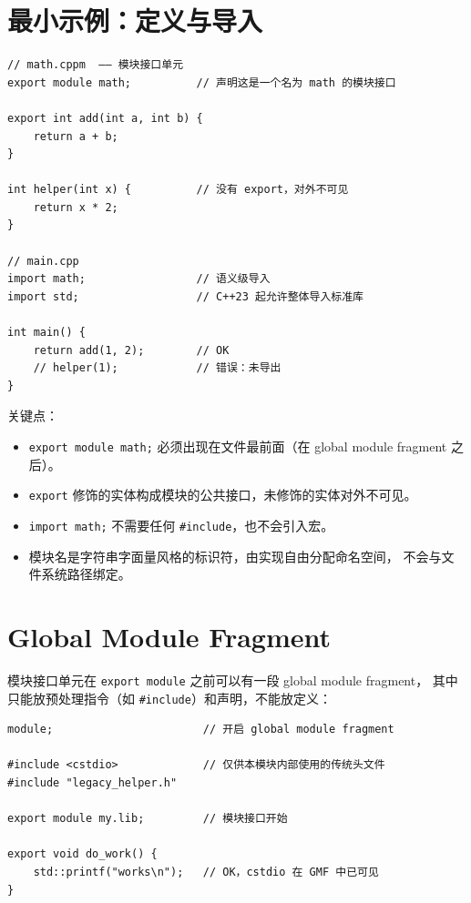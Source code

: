 \documentclass[12pt,a4paper,fontset=fandol]{ctexbook}
\newcommand{\cpplabel}{%
  \tcbox[on line,colback=cppheadbg,colframe=cppheadbg,
    boxrule=0pt,arc=1pt,left=2pt,right=2pt,top=1pt,bottom=1pt,
    colupper=white,fontupper=\scriptsize\bfseries]{C++}}
\newcommand{\flag}[1]{\texttt{#1}}
\begin{document}
\section{最小示例：定义与导入}

\cpplabel
\begin{lstlisting}[style=cppstyle]
// math.cppm  —— 模块接口单元
export module math;          // 声明这是一个名为 math 的模块接口

export int add(int a, int b) {
    return a + b;
}

int helper(int x) {          // 没有 export，对外不可见
    return x * 2;
}

// main.cpp
import math;                 // 语义级导入
import std;                  // C++23 起允许整体导入标准库

int main() {
    return add(1, 2);        // OK
    // helper(1);            // 错误：未导出
}
\end{lstlisting}

关键点：

\begin{itemize}
  \item \flag{export module math;} 必须出现在文件最前面（在 global module fragment 之后）。
  \item \flag{export} 修饰的实体构成模块的公共接口，未修饰的实体对外不可见。
  \item \flag{import math;} 不需要任何 \flag{\#include}，也不会引入宏。
  \item 模块名是字符串字面量风格的标识符，由实现自由分配命名空间，
        不会与文件系统路径绑定。
\end{itemize}

\section{Global Module Fragment}

模块接口单元在 \flag{export module} 之前可以有一段 global module fragment，
其中只能放预处理指令（如 \flag{\#include}）和声明，不能放定义：

\cpplabel
\begin{lstlisting}[style=cppstyle]
module;                       // 开启 global module fragment

#include <cstdio>             // 仅供本模块内部使用的传统头文件
#include "legacy_helper.h"

export module my.lib;         // 模块接口开始

export void do_work() {
    std::printf("works\n");   // OK，cstdio 在 GMF 中已可见
}
\end{lstlisting}
\end{document}
